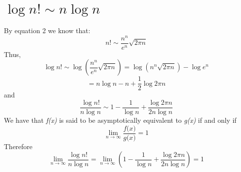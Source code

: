 \documentclass{article}
\begin{document}
\section{\(\log{n!} \sim n\log{n}\)}
    By equation 2 we know that:
    \[n! \sim \frac{n^{n}}{e^{n}}\sqrt{2\pi n}\]
    Thus,
    \[\log{n!} \sim \log{(\frac{n^{n}}{e^{n}}\sqrt{2\pi n})} = \log{(n^{n}\sqrt{2\pi n})} - \log{e^{n}}\]
    \begin{equation}
         = n\log{n} - n + \frac{1}{2}\log{2\pi n}
    \end{equation}
    and
    \[\frac{\log{n!}}{n\log{n}} \sim 1 - \frac{1}{\log{n}} + \frac{\log{2\pi n}}{2n\log{n}}\]
    We have that \textit{f(x)} is said to be asymptotically equivalent to \textit{g(x)} if and only if
    \[\lim_{n \rightarrow \infty} \frac{\textit{f(x)}}{\textit{g(x)}} = 1\]
    Therefore
    \[\lim_{n \rightarrow \infty} \frac{\log{n!}}{n\log{n}} = \lim_{n \rightarrow \infty} (1 - \frac{1}{\log{n}} + \frac{\log{2\pi n}}{2n\log{n}}) = 1 \]
\end{document}
